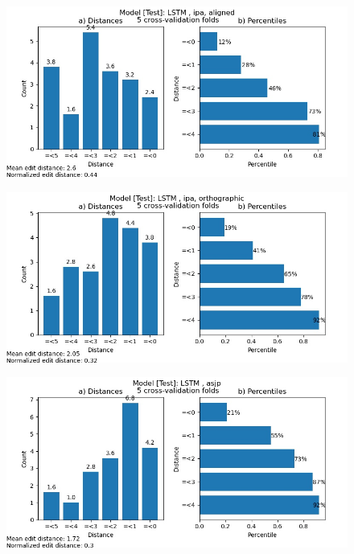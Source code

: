 \begin{figure}
    \centering
    \includegraphics[width=\textwidth]{many2one_test_ipa_aligned.jpg}
    \label{fig:smtia}
\end{figure}

\begin{figure}
    \centering
    \includegraphics[width=\textwidth]{many2one_test_ipa_ortho.jpg}
    \label{fig:smtio}
\end{figure}

\begin{figure}
    \centering
    \includegraphics[width=\textwidth]{many2one_test_asjp.jpg}
    \label{fig:smta}
\end{figure}

